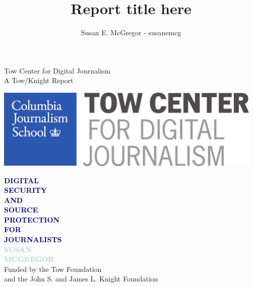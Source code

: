 \documentclass{tufte-book}
\title{Report title here}
\author{Susan E. McGregor - susanemcg}
\newcommand{\blankpage}{\newpage\hbox{}\thispagestyle{empty}\newpage}
\begin{document}
\frontmatter

\blankpage



\begin{minipage}[t][1\textheight]{0.40\textwidth}
\vspace{0pt}
\begin{flushleft}
\small\textsf{Tow Center for Digital Journalism\\
A Tow/Knight Report}
\end{flushleft}
\vfill
\includegraphics[width=.4\textwidth]{graphics/ColumbiaLogo.pdf}
\end{minipage}%
\hfill
\begin{minipage}[t][1\textheight]{70mm}
\vspace{0pt}
\Huge\textcolor{darkblue}{\textbf{{\titlefont DIGITAL\\ SECURITY\\
AND\\
SOURCE\\ PROTECTION\\
FOR\\
JOURNALISTS\\
\textcolor{lightblue}{
SUSAN\\
MCGREGOR\\
}
}
}}
\vfill
\small\textsf{Funded by the Tow Foundation\\
and the John S. and James L. Knight Foundation}
\end{minipage}%
\end{document}
